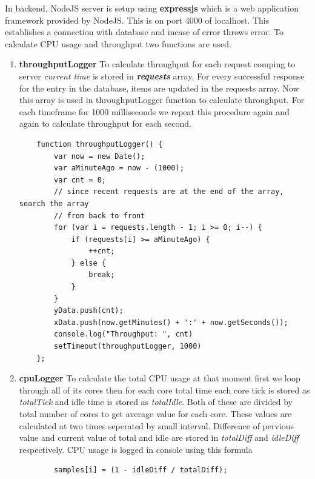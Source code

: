 \documentclass[11pt]{article}
\begin{document}
In backend, NodeJS server is setup using \textbf{expressjs} which is a web application framework provided by NodeJS. This is on port 4000 of localhost. This establishes a connection with database and incase of error throws error. To calculate CPU usage and throughput two functions are used.
\begin{enumerate}
    \item \textbf{throughputLogger} To calculate throughput for each request comping to server \textit{current time} is stored in \textbf{\textit{requests}} array. For every successful response for the entry in the database, items are updated in the requests array. Now this array is used in throughputLogger function to calculate throughput. For each timeframe for 1000 milliseconds we repeat this procedure again and again to calculate throughput for each second.
    
    \begin{lstlisting}
    function throughputLogger() {
        var now = new Date();
        var aMinuteAgo = now - (1000);
        var cnt = 0;
        // since recent requests are at the end of the array, search the array
        // from back to front
        for (var i = requests.length - 1; i >= 0; i--) {
            if (requests[i] >= aMinuteAgo) {
                ++cnt;
            } else {
                break;
            }
        }
        yData.push(cnt);
        xData.push(now.getMinutes() + ':' + now.getSeconds());
        console.log("Throughput: ", cnt)
    	setTimeout(throughputLogger, 1000)  
    };
    \end{lstlisting}
    
    \item \textbf{cpuLogger} To calculate the total CPU usage at that moment first we loop through all of its cores then for each core total time each core tick is stored as \textit{totalTick} and idle time is stored as \textit{totalIdle}. Both of these are divided by total number of cores to get average value for each core. These values are calculated at two times seperated by small interval. Difference of pervious value and current value of total and idle are stored in \textit{totalDiff} and \textit{idleDiff} respectively. CPU usage is logged in console using this formula
    
    \begin{lstlisting}
        samples[i] = (1 - idleDiff / totalDiff);
    \end{lstlisting}
\end{enumerate}
\end{document}
